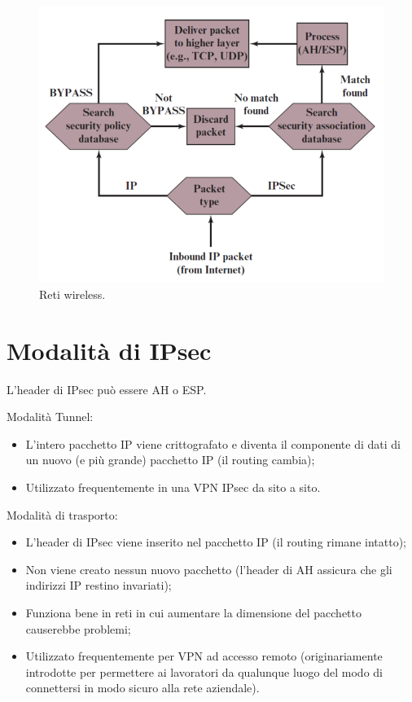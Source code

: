 \begin{figure}[h]
    \centering
    \includegraphics[width=1\textwidth]{images/chapter9/9-4.png}
    \caption{Reti wireless.}
    \label{fig:9-4}
\end{figure}

\section{Modalità di IPsec}

L'header di IPsec può essere AH o ESP.

Modalità Tunnel:
\begin{itemize}
    \item L'intero pacchetto IP viene crittografato e diventa il componente di dati di un nuovo (e più grande) pacchetto IP (il routing cambia);
	\item Utilizzato frequentemente in una VPN IPsec da sito a sito.
\end{itemize}

Modalità di trasporto:
\begin{itemize}
    \item L'header di IPsec viene inserito nel pacchetto IP (il routing rimane intatto);
	\item Non viene creato nessun nuovo pacchetto (l'header di AH assicura che gli indirizzi IP restino invariati);
	\item Funziona bene in reti in cui aumentare la dimensione del pacchetto causerebbe problemi;
	\item Utilizzato frequentemente per VPN ad accesso remoto (originariamente introdotte per permettere ai lavoratori da qualunque luogo del modo di connettersi in modo sicuro alla rete aziendale).
\end{itemize}


